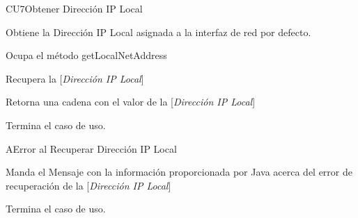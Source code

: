 \begin{UseCase}{CU7}{Obtener Dirección IP Local}{

Obtiene la Dirección IP Local asignada a la interfaz de red por defecto.

}















\end{UseCase}


\begin{UCtrayectoria}

\UCpaso[\UCactor] Ocupa el método getLocalNetAddress

\UCpaso[\UCsist] Recupera la [{\em Dirección IP Local}] 

\UCpaso[\UCsist] Retorna una cadena con el valor de la [{\em Dirección IP Local}]

\UCpaso[] Termina el caso de uso.

\end{UCtrayectoria}




\begin{UCtrayectoriaA}{A}{Error al Recuperar Dirección IP Local}

	\UCpaso Manda el Mensaje con la información proporcionada por Java acerca del error de recuperación de la [{\em Dirección IP Local}]

	\UCpaso[] Termina el caso de uso.

\end{UCtrayectoriaA}

